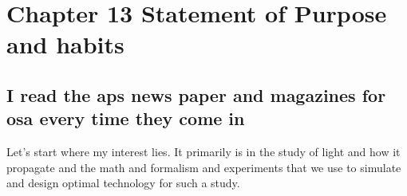 \chapter{Chapter 13 Statement of Purpose and habits}

\section{I read the aps news paper and magazines for osa every time they come in}

Let's start where my interest lies. It primarily is in the study of light and how it propagate and the math and formalism and experiments that we use to simulate and design optimal technology for such a study. 
